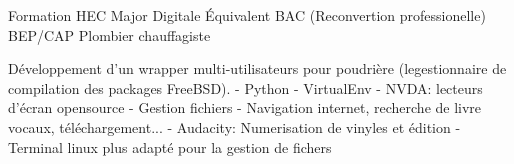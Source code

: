 \documentclass[
	a4paper,
]{FortySecondsCV/fortysecondscv}
\begin{document}
\newpage
\makebacksidebar

\begin{cvtable}[1.5]
		{Formation HEC Major Digitale}
		{Équivalent BAC (Reconvertion professionelle)}
		{BEP/CAP Plombier chauffagiste}
\end{cvtable}

\begin{cvtable}
	{
		Développement d’un wrapper multi-utilisateurs pour poudrière (legestionnaire de compilation des packages FreeBSD).
			\tabto{2mm}- Python
			\tabto{2mm}- VirtualEnv
	}
	{
		\tabto{2mm}- NVDA: lecteurs d'écran opensource
		\tabto{2mm}- Gestion fichiers
		\tabto{2mm}- Navigation internet, recherche de livre vocaux, téléchargement...
		\tabto{2mm}- Audacity: Numerisation de vinyles et édition
		\tabto{2mm}- Terminal linux plus adapté pour la gestion de fichers 
	}
\end{cvtable}

\cvsignature
\end{document}
